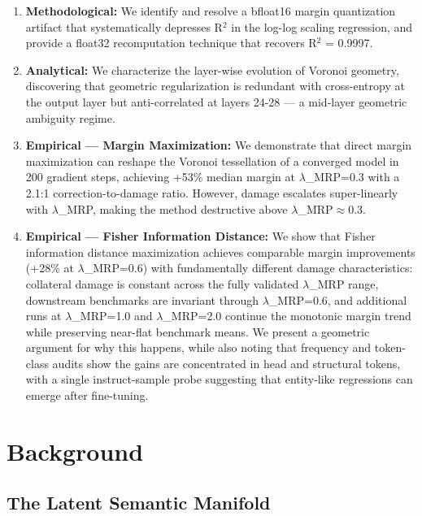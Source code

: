 \documentclass[
  11pt,
]{article}
\begin{document}
\begin{enumerate}
\def\labelenumi{\arabic{enumi}.}
\item
  \textbf{Methodological:} We identify and resolve a bfloat16 margin
  quantization artifact that systematically depresses R$^2$ in the log-log
  scaling regression, and provide a float32 recomputation technique that
  recovers R$^2$ = 0.9997.
\item
  \textbf{Analytical:} We characterize the layer-wise evolution of
  Voronoi geometry, discovering that geometric regularization is
  redundant with cross-entropy at the output layer but anti-correlated
  at layers 24-28 --- a mid-layer geometric ambiguity regime.
\item
  \textbf{Empirical --- Margin Maximization:} We demonstrate that direct
  margin maximization can reshape the Voronoi tessellation of a
  converged model in 200 gradient steps, achieving +53\% median margin
  at $\lambda$\_MRP=0.3 with a 2.1:1 correction-to-damage ratio. However, damage
  escalates super-linearly with $\lambda$\_MRP, making the method destructive
  above $\lambda$\_MRP$\approx$0.3.
\item
  \textbf{Empirical --- Fisher Information Distance:} We show that
  Fisher information distance maximization achieves comparable margin
  improvements (+28\% at $\lambda$\_MRP=0.6) with fundamentally different damage
  characteristics: collateral damage is constant across the fully
  validated $\lambda$\_MRP range, downstream benchmarks are invariant through
  $\lambda$\_MRP=0.6, and additional runs at $\lambda$\_MRP=1.0 and $\lambda$\_MRP=2.0 continue
  the monotonic margin trend while preserving near-flat benchmark means.
  We present a geometric argument for why this happens, while also
  noting that frequency and token-class audits show the gains are
  concentrated in head and structural tokens, with a single
  instruct-sample probe suggesting that entity-like regressions can
  emerge after fine-tuning.
\end{enumerate}

\hypertarget{background}{%
\section{Background}\label{background}}

\hypertarget{the-latent-semantic-manifold}{%
\subsection{The Latent Semantic
Manifold}\label{the-latent-semantic-manifold}}
\end{document}
